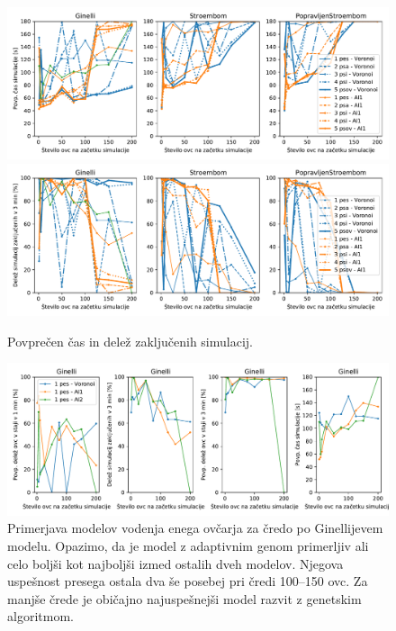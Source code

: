 \begin{figure}[ht]  %
	\centering
	\includegraphics[width=\textwidth]{../poglavja/grafi/cas.pdf}
	\includegraphics[width=\textwidth]{../poglavja/grafi/zakljucene.pdf}
	\caption[Povprečen čas in delež zaključenih simulacij]{Povprečen čas in delež zaključenih simulacij.} %
	\label{fig:cas}
\end{figure}

\begin{figure}[ht]  %
	\centering
	\includegraphics[width=\textwidth]{../poglavja/grafi/1-Ginelli.pdf}
	\caption[Primerjava modelov vodenja enega ovčarja]{Primerjava modelov vodenja enega ovčarja za čredo po Ginellijevem modelu. Opazimo, da je model z adaptivnim genom primerljiv ali celo boljši kot najboljši izmed ostalih dveh modelov. Njegova uspešnost presega ostala dva še posebej pri čredi 100--150 ovc. Za manjše črede je običajno najuspešnejši model razvit z genetskim algoritmom.} %
	\label{fig:1gin}
\end{figure}

